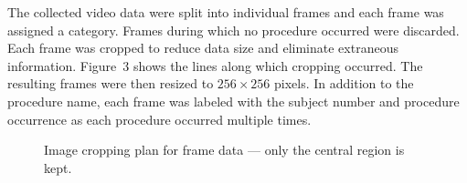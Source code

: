 \documentclass[letterpaper, 10 pt, conference]{ieeeconf}  %
\begin{document}
The collected video data were split into individual frames and each frame was assigned a category. Frames during which no procedure occurred were discarded. Each frame was cropped to reduce data size and eliminate extraneous information. Figure~3 shows the lines along which cropping occurred. The resulting frames were then resized to $256 \times 256$ pixels. In addition to the procedure name, each frame was labeled with the subject number and procedure occurrence as each procedure occurred multiple times. 





 \begin{figure}[!htb]
        \caption{\label{fig: resizing plan} Image cropping plan for frame data --- only the central region is kept.}
      \end{figure}
      
\end{document}
